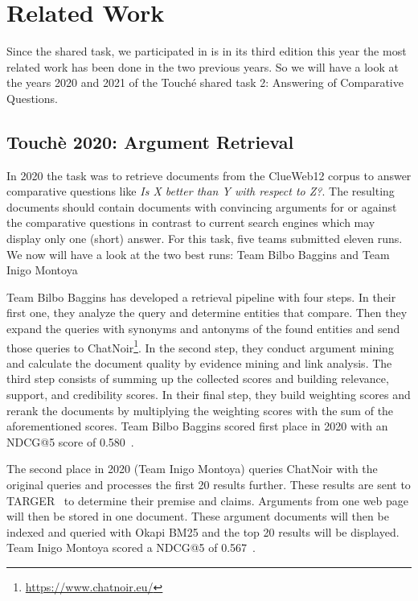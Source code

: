 \section{Related Work}
    Since the shared task, we participated in is in its third edition this year the most related work has been done in the two previous years. So we will have a look at the years 2020 and 2021 of the Touché shared task 2: Answering of Comparative Questions.
    \subsection{Touchè 2020: Argument Retrieval}
        In 2020 the task was to retrieve documents from the ClueWeb12 corpus to answer comparative questions like \textit{Is X better than Y with respect to Z?}. The resulting documents should contain documents with convincing arguments for or against the comparative questions in contrast to current search engines which may display only one (short) answer. For this task, five teams submitted eleven runs. We now will have a look at the two best runs: Team Bilbo Baggins and Team Inigo Montoya~\cite{BondarenkoFBGAPBSWPH2020}\par
        Team Bilbo Baggins has developed a retrieval pipeline with four steps. In their first one, they analyze the query and determine entities that compare. Then they expand the queries with synonyms and antonyms of the found entities and send those queries to ChatNoir\footnote{\url{https://www.chatnoir.eu/}}. In the second step, they conduct argument mining and calculate the document quality by evidence mining and link analysis. The third step consists of summing up the collected scores and building relevance, support, and credibility scores. In their final step, they build weighting scores and rerank the documents by multiplying the weighting scores with the sum of the aforementioned scores. Team Bilbo Baggins scored first place in 2020 with an NDCG@5 score of 0.580~\cite{AbyeST2020}.\par
        The second place in 2020 (Team Inigo Montoya) queries ChatNoir with the original queries and processes the first 20 results further. These results are sent to TARGER~\cite{ChernodubOHBHBP2019} to determine their premise and claims. Arguments from one web page will then be stored in one document. These argument documents will then be indexed and queried with Okapi BM25 and the top 20 results will be displayed. Team Inigo Montoya scored a NDCG@5 of 0.567~\cite{Huck2020}.
